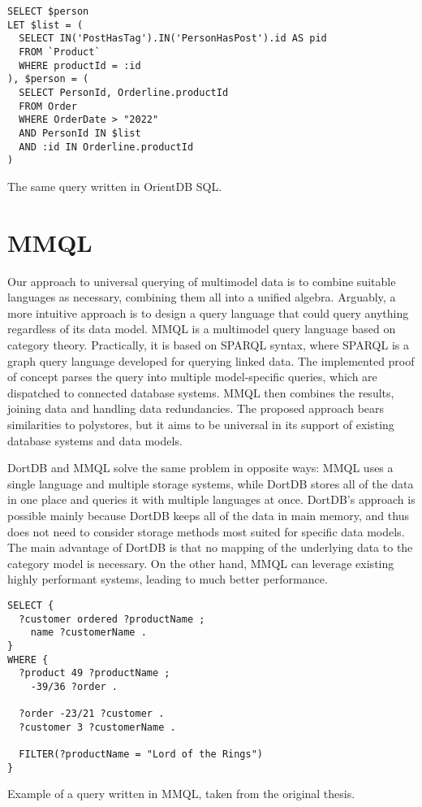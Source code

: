 \begin{listing}[!ht]
\begin{verbatim}
SELECT $person
LET $list = (
  SELECT IN('PostHasTag').IN('PersonHasPost').id AS pid
  FROM `Product`
  WHERE productId = :id
), $person = (
  SELECT PersonId, Orderline.productId
  FROM Order
  WHERE OrderDate > "2022"
  AND PersonId IN $list
  AND :id IN Orderline.productId
)
\end{verbatim}
\caption{The same query written in OrientDB SQL.}
\end{listing}

\section{MMQL}

Our approach to universal querying of multimodel data is to combine suitable languages as necessary, combining them all into a unified algebra. Arguably, a more intuitive approach is to design a query language that could query anything regardless of its data model. MMQL\cite{DBLP:journals/is/KoupilCH25} is a multimodel query language based on category theory. Practically, it is based on SPARQL syntax, where SPARQL is a graph query language developed for querying linked data. The implemented proof of concept parses the query into multiple model-specific queries, which are dispatched to connected database systems. MMQL then combines the results, joining data and handling data redundancies. The proposed approach bears similarities to polystores, but it aims to be universal in its support of existing database systems and data models.

DortDB and MMQL solve the same problem in opposite ways: MMQL uses a single language and multiple storage systems, while DortDB stores all of the data in one place and queries it with multiple languages at once. DortDB's approach is possible mainly because DortDB keeps all of the data in main memory, and thus does not need to consider storage methods most suited for specific data models. The main advantage of DortDB is that no mapping of the underlying data to the category model is necessary. On the other hand, MMQL can leverage existing highly performant systems, leading to much better performance.


\begin{listing}[!ht]
\begin{verbatim}
SELECT {
  ?customer ordered ?productName ;
    name ?customerName .
}
WHERE {
  ?product 49 ?productName ;
    -39/36 ?order .

  ?order -23/21 ?customer .
  ?customer 3 ?customerName .

  FILTER(?productName = "Lord of the Rings")
}
\end{verbatim}
\caption{Example of a query written in MMQL, taken from the original thesis\cite{DBLP:journals/is/KoupilCH25}.}
\end{listing}

